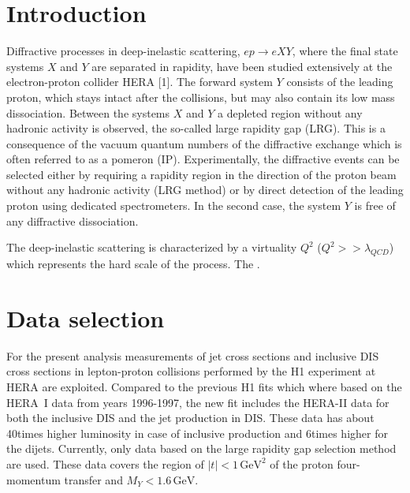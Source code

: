 \documentclass[12pt]{article}
\begin{document}





\clearpage

\pagestyle{plain} %


\section{Introduction}

Diffractive processes in deep-inelastic scattering, $ep \to eXY$, where the final state systems $X$ and $Y$ are separated in rapidity, have been studied extensively at the electron-proton collider HERA [1].
%
The forward system $Y$ consists of the leading proton, which stays intact after the collisions, but may also contain its low mass dissociation.
%
Between the systems $X$ and $Y$ a depleted region without any hadronic activity is observed, the so-called large rapidity gap
(LRG).
%
This is a consequence of the vacuum quantum numbers of the diffractive exchange which is often referred to as a pomeron (IP).
%
Experimentally, the diffractive events can be selected either by requiring a rapidity region in the direction of the proton beam without any hadronic activity (LRG method) or by direct detection of the leading proton using dedicated spectrometers.
%
In the second case, the system $Y$ is free of any diffractive dissociation.

The deep-inelastic scattering is characterized by a virtuality $Q^2$ ($Q^2 >> \lambda_{QCD}$) which represents the hard scale of the process.
The \cite{Collins:1997sr}.




\section{Data selection}
For the present analysis measurements of jet cross sections and inclusive DIS cross sections in lepton-proton collisions performed by the H1 experiment at HERA are exploited.
%
Compared to the previous H1 fits \cite{Aktas:2006hy,Aktas:2007bv} which where based on the HERA~I data from years 1996-1997, the new fit includes the HERA-II data for both the inclusive DIS and the jet production in DIS.
These data has about 40times higher luminosity in case of inclusive production and 6times higher for the dijets.
Currently, only data based on the large rapidity gap selection method are used.
These data covers the region of $|t| < 1\,\text{GeV}^2$ of the proton four-momentum transfer and $M_Y < 1.6\,\text{GeV}$.
\end{document}
